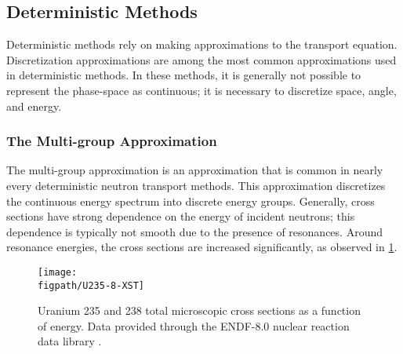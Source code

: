 {{        \subsection{Deterministic Methods}{\label{ssec:NTT:Deterministic Methods}
            Deterministic methods rely on making approximations to the transport equation.
            Discretization approximations are among the most common approximations used in deterministic methods.
            In these methods, it is generally not possible to represent the phase-space as continuous; it is necessary to discretize space, angle, and energy.

            
            \subsubsection{The Multi-group Approximation}{\label{sssec:NTT:The Multi-group Approximation}
                The multi-group approximation is an approximation that is common in nearly every deterministic neutron transport methods.
                This approximation discretizes the continuous energy spectrum into discrete energy groups.
                Generally, cross sections have strong dependence on the energy of incident neutrons; this dependence is typically not smooth due to the presence of resonances.
                Around resonance energies, the cross sections are increased significantly, as observed in \cref{fig:NTT:Cross Section plot}.

                \begin{figure}[h]
                    \centering
                    \texttt{[image: \\figpath/U235-8-XST]}
                    \caption{Uranium 235 and 238 total microscopic cross sections as a function of energy. Data provided through the ENDF-8.0 nuclear reaction data library \cite{ENDF8}.}
                    \label{fig:NTT:Cross Section plot}
                \end{figure}

}}}}
